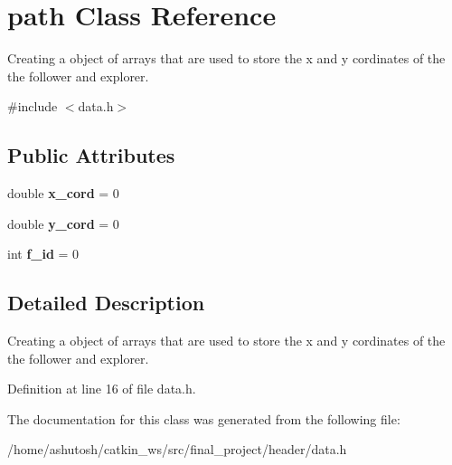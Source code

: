 \hypertarget{classpath}{}\section{path Class Reference}
\label{classpath}


Creating a object of arrays that are used to store the x and y cordinates of the the follower and explorer.  




{\ttfamily \#include $<$data.\+h$>$}

\subsection*{Public Attributes}
\begin{DoxyCompactItemize}
\item 
\mbox{\label{classpath_ac6264a569f37ab849f6f3975e8a7ba37}} 
double {\bfseries x\+\_\+cord} = 0
\item 
\mbox{\label{classpath_a4b52cdc69eb3e91576d343b1539aa3e3}} 
double {\bfseries y\+\_\+cord} = 0
\item 
\mbox{\label{classpath_a52894d0a8d7869c50aeca8a532d34437}} 
int {\bfseries f\+\_\+id} = 0
\end{DoxyCompactItemize}


\subsection{Detailed Description}
Creating a object of arrays that are used to store the x and y cordinates of the the follower and explorer. 

Definition at line 16 of file data.\+h.



The documentation for this class was generated from the following file\+:\begin{DoxyCompactItemize}
\item 
/home/ashutosh/catkin\+\_\+ws/src/final\+\_\+project/header/data.\+h\end{DoxyCompactItemize}
